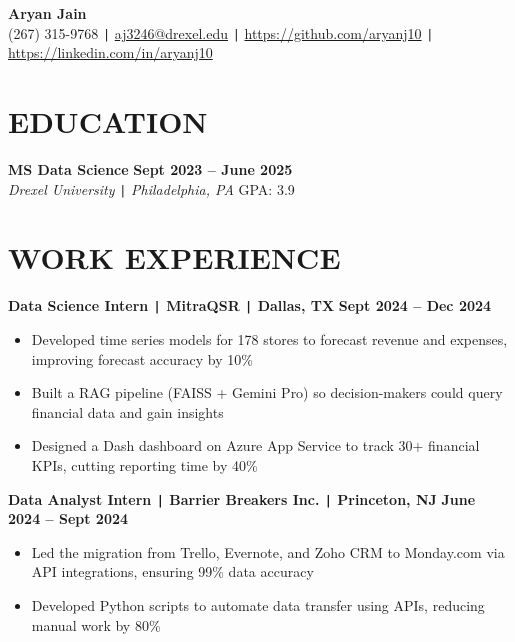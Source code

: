 \documentclass[10pt]{article}
\begin{document}
\begin{center}
    \textbf{\fontsize{18}{18}\selectfont Aryan Jain} \\
    (267) 315-9768 \texttt{|} \href{mailto:aj3246@drexel.edu}{aj3246@drexel.edu} \texttt{|}
    \href{https://github.com/aryanj10}{https://github.com/aryanj10} \texttt{|}  
    \href{https://linkedin.com/in/aryanj10}{https://linkedin.com/in/aryanj10}
\end{center}

\vspace{-0.7cm}
\section*{EDUCATION} 
\vspace{-0.2cm} 

\noindent 
\textbf{MS Data Science} \hfill \textbf{Sept 2023 -- June 2025} \\
\textit{Drexel University} \texttt{|} \textit{Philadelphia, PA} \hfill GPA: 3.9



\vspace{-0.4cm}
\section*{WORK EXPERIENCE}

\vspace{-0.2cm}
\noindent
\textbf{Data Science Intern \texttt{|} MitraQSR \texttt{|} Dallas, TX} \hfill \textbf{Sept 2024 -- Dec 2024} 
\vspace{-0.15cm}
\begin{itemize}[leftmargin=0.5cm, itemsep=0pt]

    \item Developed time series models for 178 stores to forecast revenue and expenses, improving forecast accuracy by 10\%

    \item Built a RAG pipeline (FAISS + Gemini Pro) so decision-makers could query financial data and gain insights

    \item Designed a Dash dashboard on Azure App Service to track 30+ financial KPIs, cutting reporting time by 40\%

\end{itemize}

\vspace{-0.2cm}
\noindent
\textbf{Data Analyst Intern \texttt{|} Barrier Breakers Inc. \texttt{|} Princeton, NJ} \hfill \textbf{June 2024 -- Sept 2024} 
\vspace{-0.15cm}
\begin{itemize}[leftmargin=0.5cm, itemsep=0pt]

    \item Led the migration from Trello, Evernote, and Zoho CRM to Monday.com via API integrations, ensuring 99\% data accuracy

    \item Developed Python scripts to automate data transfer using APIs, reducing manual work by 80\%

\end{itemize}
\end{document}

